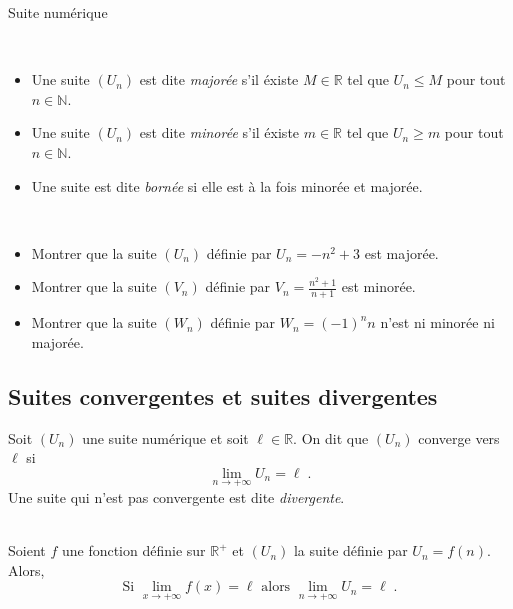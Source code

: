 \begin{chapter}{Suite num\'erique}
\begin{exe}
\end{exe}
%
\begin{defi} ~ \\
%
\begin{itemize} 
\item Une suite $(U_n)$ est dite \emph{major\'ee} s'il \'existe $M \in \mathbb{R}$ tel que $U_n \leq M$ pour tout $n \in \mathbb{N}$.
\item Une suite $(U_n)$ est dite \emph{minor\'ee} s'il \'existe $m \in \mathbb{R}$ tel que $U_n \geq m$ pour tout $n \in \mathbb{N}$.
\item Une suite est dite \emph{born\'ee} si elle est \`a la fois minor\'ee et major\'ee.
\end{itemize}
\end{defi}
%
\begin{exe} ~ \\
\label{exe:suite bornee}
\begin{itemize} 
\item Montrer que la suite $(U_n)$ d\'efinie par $U_n = -n^2 + 3 $ est major\'ee.
\item Montrer que la suite $(V_n)$ d\'efinie par $V_n = \frac{n^2 + 1}{n + 1} $ est minor\'ee.
\item Montrer que la suite $(W_n)$ d\'efinie par $W_n = (-1)^n n $ n'est ni minor\'ee ni major\'ee.
\end{itemize}

\end{exe}
%
\subsection{Suites convergentes et suites divergentes}
%
\begin{defi}[Convergence]
Soit $(U_n)$ une suite num\'erique et soit $\ell \in \mathbb{R}$.
On dit que $(U_n)$ converge vers $\ell$ si 
$$
\lim_{n \rightarrow + \infty} U_n = \ell \; .
$$
Une suite qui n'est pas convergente est dite \emph{divergente}.
\end{defi}
%
\begin{prop} ~ \\
Soient $f$ une fonction d\'efinie sur $\mathbb{R}^+$ et $(U_n)$ la suite d\'efinie par ${U_n = f(n)}$.
Alors, 
\[
\text{Si } \lim_{x \rightarrow + \infty} f(x) = \ell \text{ alors } \lim_{n \rightarrow + \infty} U_n = \ell      \; .
\]
\end{prop}


\end{chapter}
